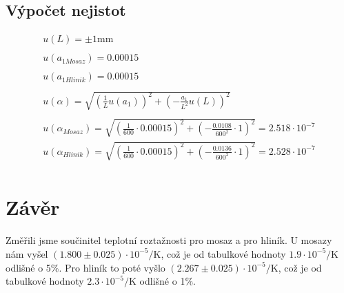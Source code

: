\documentclass[a4paper,10pt]{article}
\begin{document}
\subsection{Výpočet nejistot}
\begin{gather*}
 u(L) = \pm1 \si{\milli\meter} \\
 \\
 u(a_{1 Mosaz}) = 0.00015 \\
 \\
 u(a_{1 Hlinik}) = 0.00015\\
 \\
 u(\alpha) = \sqrt{(\frac{1}{L} u(a_1))^2 + (-\frac{a_1}{L^2} u(L))^2}\\
 \\
 u(\alpha_{Mosaz}) = \sqrt{(\frac{1}{600} \cdot 0.00015)^2 + (-\frac{0.0108}{600^2} \cdot 1)^2} = 2.518 \cdot 10^{-7}\\
 u(\alpha_{Hlinik}) = \sqrt{(\frac{1}{600} \cdot 0.00015)^2 + (-\frac{0.0136}{600^2} \cdot 1)^2} = 2.528 \cdot 10^{-7}\\
\end{gather*}

\section{Závěr}
Změřili jsme součinitel teplotní roztažnosti pro mosaz a pro hliník. U mosazy nám vyšel $(1.800 \pm 0.025) \cdot 10^{-5} \si{\per\kelvin}$, což je od tabulkové hodnoty $1.9 \cdot 10^{-5} \si{\per\kelvin}$  odlišné o 5\%. Pro hliník to poté vyšlo $(2.267 \pm 0.025) \cdot 10^{-5} \si{\per\kelvin}$, což je od tabulkové hodnoty $2.3 \cdot 10^{-5} \si{\per\kelvin}$  odlišné o 1\%.
\end{document}
